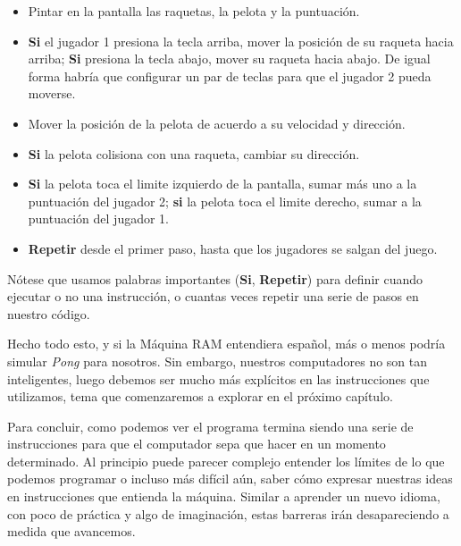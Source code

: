 \begin{itemize}
	\begin{itemize}
		\item Pintar en la pantalla las raquetas, la pelota y la puntuación.
		
		\item \textbf{Si} el jugador 1 presiona la tecla arriba, mover la posición de su raqueta hacia arriba; \textbf{Si} presiona la tecla abajo, mover su raqueta hacia abajo. De igual forma habría que configurar un par de teclas para que el jugador 2 pueda moverse.
		
		\item Mover la posición de la pelota de acuerdo a su velocidad y dirección.
		
		\item \textbf{Si} la pelota colisiona con una raqueta, cambiar su dirección.
		
		\item \textbf{Si} la pelota toca el limite izquierdo de la pantalla, sumar más uno a la puntuación del jugador 2; \textbf{si} la pelota toca el limite derecho, sumar a la puntuación del jugador 1.
				
		\item \textbf{Repetir} desde el primer paso, hasta que los jugadores se salgan del juego.
	\end{itemize}
\end{itemize}

Nótese que usamos palabras importantes (\textbf{Si}, \textbf{Repetir}) para definir cuando ejecutar o no una instrucción, o cuantas veces repetir una serie de pasos en nuestro código.

Hecho todo esto, y si la Máquina RAM entendiera español, más o menos podría simular \emph{Pong} para nosotros. Sin embargo, nuestros computadores no son tan inteligentes, luego debemos ser mucho más explícitos en las instrucciones que utilizamos, tema que comenzaremos a explorar en el próximo capítulo.

Para concluir, como podemos ver el programa termina siendo una serie de instrucciones para que el computador sepa que hacer en un momento determinado. Al principio puede parecer complejo entender los límites de lo que podemos programar o incluso más difícil aún, saber cómo expresar nuestras ideas en instrucciones que entienda la máquina. Similar a aprender un nuevo idioma, con poco de práctica y algo de imaginación, estas barreras irán desapareciendo a medida que avancemos.

